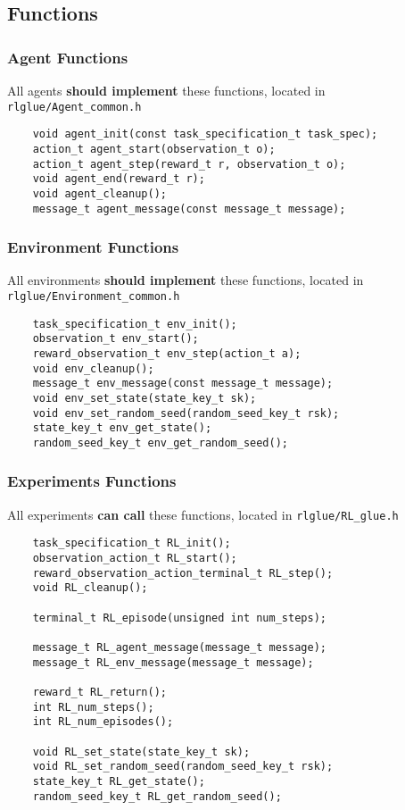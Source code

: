 \documentclass[11pt]{article}
\begin{document}
\subsection{Functions}
\subsubsection{Agent Functions}
All agents \textbf{should implement} these functions, located in \texttt{rlglue/Agent\_common.h}
\begin{verbatim}
    void agent_init(const task_specification_t task_spec);
    action_t agent_start(observation_t o);
    action_t agent_step(reward_t r, observation_t o);
    void agent_end(reward_t r);  
    void agent_cleanup();
    message_t agent_message(const message_t message);
\end{verbatim}

\subsubsection{Environment Functions}
All environments \textbf{should implement} these functions, located in \texttt{rlglue/Environment\_common.h}
\begin{verbatim}
    task_specification_t env_init();
    observation_t env_start();
    reward_observation_t env_step(action_t a);
    void env_cleanup();
    message_t env_message(const message_t message);
    void env_set_state(state_key_t sk);
    void env_set_random_seed(random_seed_key_t rsk);
    state_key_t env_get_state();
    random_seed_key_t env_get_random_seed();
\end{verbatim}

\subsubsection{Experiments Functions}
All experiments \textbf{can call} these functions, located in \texttt{rlglue/RL\_glue.h}
\begin{verbatim}
    task_specification_t RL_init();
    observation_action_t RL_start();
    reward_observation_action_terminal_t RL_step();
    void RL_cleanup();

    terminal_t RL_episode(unsigned int num_steps);

    message_t RL_agent_message(message_t message);
    message_t RL_env_message(message_t message);

    reward_t RL_return();
    int RL_num_steps();
    int RL_num_episodes();

    void RL_set_state(state_key_t sk);
    void RL_set_random_seed(random_seed_key_t rsk);
    state_key_t RL_get_state();
    random_seed_key_t RL_get_random_seed();
\end{verbatim}
\end{document}
